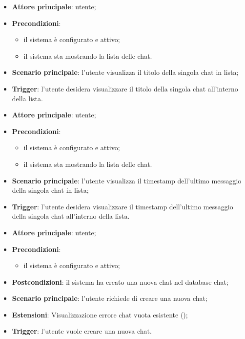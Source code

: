 \documentclass[10pt, a4paper]{article}
\begin{document}
    \begin{itemize}
        \item \textbf{Attore principale}: utente;
        \item \textbf{Precondizioni}:
            \begin{itemize}
                \item il sistema è configurato e attivo;
                \item il sistema sta mostrando la lista delle chat.
            \end{itemize}
        \item \textbf{Scenario principale}: l'utente visualizza il titolo della singola chat in lista;
        \item \textbf{Trigger}: l’utente desidera visualizzare il titolo della singola chat all’interno della lista.
    \end{itemize}

    \begin{itemize}
        \item \textbf{Attore principale}: utente;
        \item \textbf{Precondizioni}:
            \begin{itemize}
                \item il sistema è configurato e attivo;
                \item il sistema sta mostrando la lista delle chat.
            \end{itemize}
        \item \textbf{Scenario principale}: l'utente visualizza il timestamp dell'ultimo messaggio della singola chat in lista;
        \item \textbf{Trigger}: l’utente desidera visualizzare il timestamp dell'ultimo messaggio della singola chat all’interno della lista.
    \end{itemize}

    \begin{itemize}
        \item \textbf{Attore principale}: utente;
        \item \textbf{Precondizioni}:
        \begin{itemize}
            \item il sistema è configurato e attivo;
        \end{itemize}
        \item \textbf{Postcondizioni}: il sistema ha creato una nuova chat nel database chat;
        \item \textbf{Scenario principale}: l’utente richiede di creare una nuova chat;
        \item \textbf{Estensioni}: Visualizzazione errore chat vuota esistente ();
        \item \textbf{Trigger}: l’utente vuole creare una nuova chat.
    \end{itemize}
\end{document}

